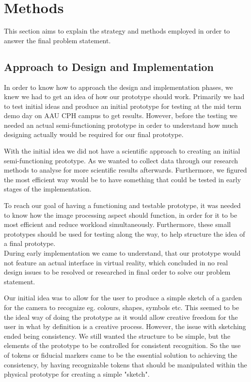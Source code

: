 \chapter{Methods}
This section aims to explain the strategy and methods employed in order to answer the final problem statement. 

\section{Approach to Design and Implementation}
In order to know how to approach the design and implementation phases, we knew we had to get an idea of how our prototype should work. Primarily we had to test initial ideas and produce an initial prototype for testing at the mid term demo day on AAU CPH campus to get results. However, before the testing we needed an actual semi-functioning prototype in order to understand how much designing actually would be required for our final prototype.

With the initial idea we did not have a scientific approach to creating an initial semi-functioning prototype. As we wanted to collect data through our research methods to analyse for more scientific results afterwards. Furthermore, we figured the most efficient way would be to have something that could be tested in early stages of the implementation.

To reach our goal of having a functioning and testable prototype, it was needed to know how the image processing aspect should function, in order for it to be most efficient and reduce workload simultaneously. Furthermore, these small prototypes should be used for testing along the way, to help structure the idea of a final prototype. \\

During early implementation we came to understand, that our prototype would not feature an actual interface in virtual reality, which concluded in no real design issues to be resolved or researched in final order to solve our problem statement. 

Our initial idea was to allow for the user to produce a simple sketch of a garden for the camera to recognize eg. colours, shapes, symbols etc. This seemed to be the ideal way of doing the prototype as it would allow creative freedom for the user in what by definition is a creative process. However, the issue with sketching ended being consistency. We still wanted the structure to be simple, but the elements of the prototype to be controlled for consistent recognition. So the use of tokens or fiducial markers came to be the essential solution to achieving the consistency, by having recognizable tokens that should be manipulated within the physical prototype for creating a simple "sketch".

